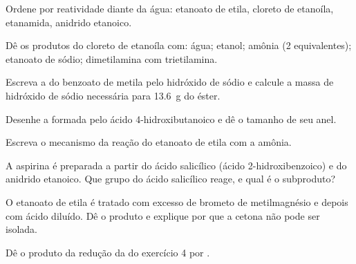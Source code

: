 \begin{exercise}[$\star$]\label{exo:b2:acyl-substitution:1}
Ordene por reatividade diante da água: etanoato de etila, cloreto de etanoíla, etanamida, anidrido
etanoico.
\end{exercise}

\begin{exercise}[$\star$]\label{exo:b2:acyl-substitution:2}
Dê os produtos do cloreto de etanoíla com: água; etanol; amônia (2 equivalentes);
etanoato de sódio; dimetilamina com trietilamina.
\end{exercise}

\begin{exercise}[$\star$]\label{exo:b2:acyl-substitution:3}
Escreva a  do benzoato de metila pelo hidróxido de sódio e calcule a massa de
hidróxido de sódio necessária para \qty{13.6}{g} do éster.
\end{exercise}

\begin{exercise}[$\star$]\label{exo:b2:acyl-substitution:4}
Desenhe a  formada pelo ácido 4-hidroxibutanoico e dê o tamanho de seu anel.
\end{exercise}

\begin{exercise}[$\star\star$]\label{exo:b2:acyl-substitution:5}
Escreva o mecanismo da reação do etanoato de etila com a amônia.
\end{exercise}

\begin{exercise}[$\star\star$]\label{exo:b2:acyl-substitution:6}
A aspirina é preparada a partir do ácido salicílico (ácido 2-hidroxibenzoico) e do anidrido
etanoico. Que grupo do ácido salicílico reage, e qual é o subproduto?
\end{exercise}

\begin{exercise}[$\star\star$]\label{exo:b2:acyl-substitution:7}
O etanoato de etila é tratado com excesso de brometo de metilmagnésio e depois com ácido diluído.
Dê o produto e explique por que a cetona não pode ser isolada.
\end{exercise}

\begin{exercise}[$\star\star$]\label{exo:b2:acyl-substitution:8}
Dê o produto da redução da  do exercício 4 por .
\end{exercise}

